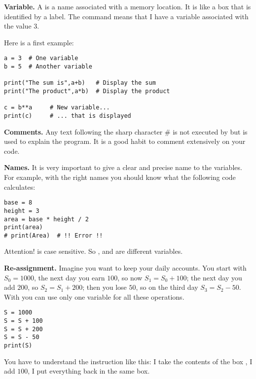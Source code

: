 \documentclass[11pt,class=report,crop=false]{standalone}
\begin{document}

\begin{cours}[Variables]


\textbf{Variable.} 
A  is a name associated with a memory location. It is like a box that is identified by a label.
The command \og{}\fg{} means that I have a variable \og{}\fg{} associated with the value $3$. 

Here is a first example:
\begin{lstlisting}
a = 3  # One variable
b = 5  # Another variable

print("The sum is",a+b)   # Display the sum
print("The product",a*b)  # Display the product

c = b**a     # New variable...
print(c)     # ... that is displayed
\end{lstlisting}


\medskip

\textbf{Comments.}
Any text following the sharp character \og{}\#\fg{} is not executed by \Python{} but is used to explain the program. It is a good habit to comment extensively on your code.

 
\medskip

\textbf{Names.} 
It is very important to give a clear and precise name to the variables. For example, with the right names you should know what the following code calculates:
\begin{lstlisting}
base = 8
height = 3
area = base * height / 2
print(area)
# print(Area)  # !! Error !!
\end{lstlisting}

Attention! \Python{} is case sensitive. So ,  and  are different variables.

\medskip

\textbf{Re-assignment.} Imagine you want to keep your daily accounts. You start with $S_0 = 1000$, the next day you earn $100$, so now $S_1 = S_0 + 100$; the next day you add $200$, so $S_2 = S_1 + 200$; then you lose $50$, so on the third day $S_3 = S_2 - 50$. With \Python{} you can use only one variable  for all these operations.

\begin{lstlisting}
S = 1000
S = S + 100
S = S + 200
S = S - 50
print(S)
\end{lstlisting}
You have to understand the instruction \og{}\fg{} like this: \og{}I take the contents of the box , I add $100$, I put everything back in the same box\fg{}.
\end{cours}
\end{document}
